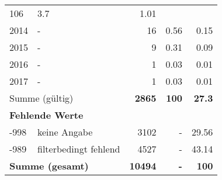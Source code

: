 \begin{longtable}{lXrrr}
       \num{106} &
       \num[round-mode=places,round-precision=2]{3,7} &
         \num[round-mode=places,round-precision=2]{1,01} \\

     2014 &
     \multicolumn{1}{X}{ -  } &


       \num{16} &
       \num[round-mode=places,round-precision=2]{0,56} &
         \num[round-mode=places,round-precision=2]{0,15} \\

     2015 &
     \multicolumn{1}{X}{ -  } &


       \num{9} &
       \num[round-mode=places,round-precision=2]{0,31} &
         \num[round-mode=places,round-precision=2]{0,09} \\

     2016 &
     \multicolumn{1}{X}{ -  } &


       \num{1} &
       \num[round-mode=places,round-precision=2]{0,03} &
         \num[round-mode=places,round-precision=2]{0,01} \\

     2017 &
     \multicolumn{1}{X}{ -  } &


       \num{1} &
       \num[round-mode=places,round-precision=2]{0,03} &
         \num[round-mode=places,round-precision=2]{0,01} \\
     \midrule
     \multicolumn{2}{l}{Summe (gültig)} &
       \textbf{\num{2865}} &
     \textbf{100} &
       \textbf{\num[round-mode=places,round-precision=2]{27,3}} \\
     \multicolumn{5}{l}{\textbf{Fehlende Werte}}\\
       -998 &
       keine Angabe &
         \num{3102} &
        - &
         \num[round-mode=places,round-precision=2]{29,56} \\
       -989 &
       filterbedingt fehlend &
         \num{4527} &
        - &
         \num[round-mode=places,round-precision=2]{43,14} \\
     \midrule
     \multicolumn{2}{l}{\textbf{Summe (gesamt)}} &
          \textbf{\num{10494}} &
        \textbf{-} &
        \textbf{100} \\
     \bottomrule
     \end{longtable}
     
